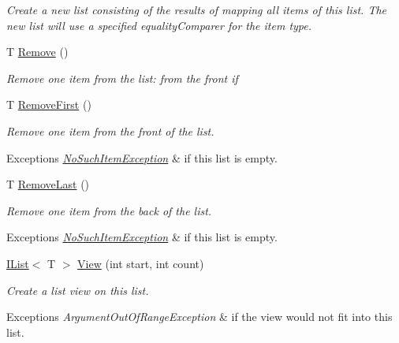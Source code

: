 \begin{DoxyCompactItemize}
\begin{DoxyCompactList}\small\item\em Create a new list consisting of the results of mapping all items of this list. The new list will use a specified equality\+Comparer for the item type. \end{DoxyCompactList}\item 
T \hyperlink{interface_c5_1_1_i_list_ae0d9be125f478fed048c4c08159ae399}{Remove} ()
\begin{DoxyCompactList}\small\item\em Remove one item from the list\+: from the front if \end{DoxyCompactList}\item 
T \hyperlink{interface_c5_1_1_i_list_a6f5c3f67673d43604aa28a7d2b6508ff}{Remove\+First} ()
\begin{DoxyCompactList}\small\item\em Remove one item from the front of the list. 
\begin{DoxyExceptions}{Exceptions}
{\em \hyperlink{class_c5_1_1_no_such_item_exception}{No\+Such\+Item\+Exception}} & if this list is empty. \\
\hline
\end{DoxyExceptions}
\end{DoxyCompactList}\item 
T \hyperlink{interface_c5_1_1_i_list_adfbae9e7ea5cb9ff3e0fd45f1201334a}{Remove\+Last} ()
\begin{DoxyCompactList}\small\item\em Remove one item from the back of the list. 
\begin{DoxyExceptions}{Exceptions}
{\em \hyperlink{class_c5_1_1_no_such_item_exception}{No\+Such\+Item\+Exception}} & if this list is empty. \\
\hline
\end{DoxyExceptions}
\end{DoxyCompactList}\item 
\hyperlink{interface_c5_1_1_i_list}{I\+List}$<$ T $>$ \hyperlink{interface_c5_1_1_i_list_a402c21a9b1f0e2295303d35b6db5d273}{View} (int start, int count)
\begin{DoxyCompactList}\small\item\em Create a list view on this list. 
\begin{DoxyExceptions}{Exceptions}
{\em Argument\+Out\+Of\+Range\+Exception} & if the view would not fit into this list. \\
\hline
\end{DoxyExceptions}

\end{DoxyCompactList}
\end{DoxyCompactItemize}
